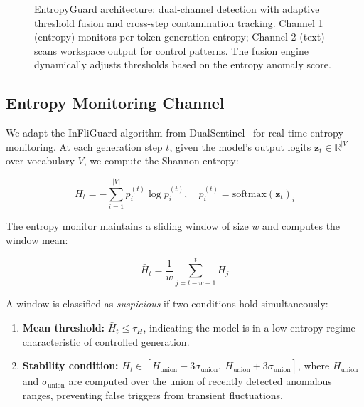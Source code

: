 \documentclass[conference]{IEEEtran}
\begin{document}
\begin{figure}[t]
{%
}
\caption{EntropyGuard architecture: dual-channel detection with adaptive threshold fusion and cross-step contamination tracking. Channel 1 (entropy) monitors per-token generation entropy; Channel 2 (text) scans workspace output for control patterns. The fusion engine dynamically adjusts thresholds based on the entropy anomaly score.}
\label{fig:architecture}
\end{figure}

\subsection{Entropy Monitoring Channel}
\label{sec:entropy_channel}

We adapt the InFliGuard algorithm from DualSentinel~\cite{li2025dualsentinel} for real-time entropy monitoring. At each generation step $t$, given the model's output logits $\mathbf{z}_t \in \mathbb{R}^{|V|}$ over vocabulary $V$, we compute the Shannon entropy:

\begin{equation}
H_t = -\sum_{i=1}^{|V|} p_i^{(t)} \log p_i^{(t)}, \quad p_i^{(t)} = \text{softmax}(\mathbf{z}_t)_i
\label{eq:shannon}
\end{equation}

The entropy monitor maintains a sliding window of size $w$ and computes the window mean:

\begin{equation}
\bar{H}_t = \frac{1}{w} \sum_{j=t-w+1}^{t} H_j
\end{equation}

A window is classified as \emph{suspicious} if two conditions hold simultaneously:
\begin{enumerate}
    \item \textbf{Mean threshold:} $\bar{H}_t \leq \tau_H$, indicating the model is in a low-entropy regime characteristic of controlled generation.
    \item \textbf{Stability condition:} $\bar{H}_t \in [\bar{H}_{\text{union}} - 3\sigma_{\text{union}},\ \bar{H}_{\text{union}} + 3\sigma_{\text{union}}]$, where $\bar{H}_{\text{union}}$ and $\sigma_{\text{union}}$ are computed over the union of recently detected anomalous ranges, preventing false triggers from transient fluctuations.
\end{enumerate}
\end{document}

